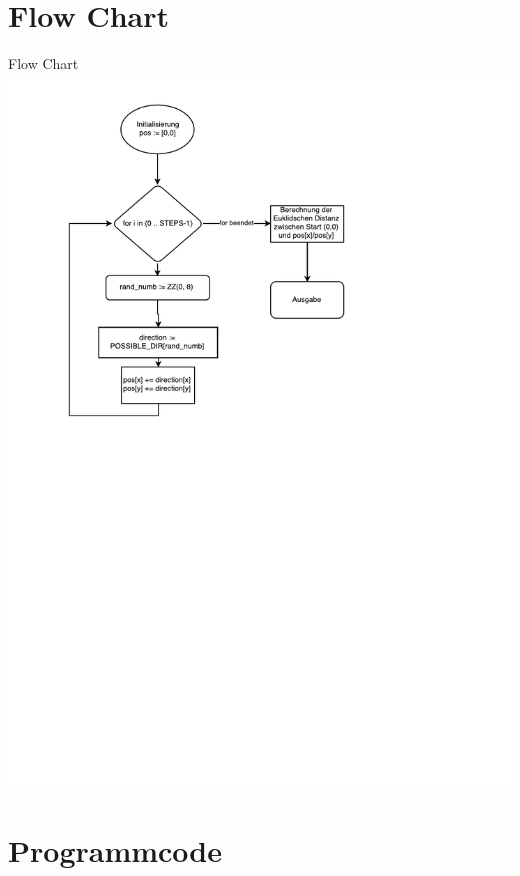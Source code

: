 \section{Flow Chart}
\begin{frame}{Flow Chart}
	\centering
  	\includegraphics[scale=0.5]{BSP07_Flow_Chart.pdf}
\end{frame}

\section{Programmcode}
